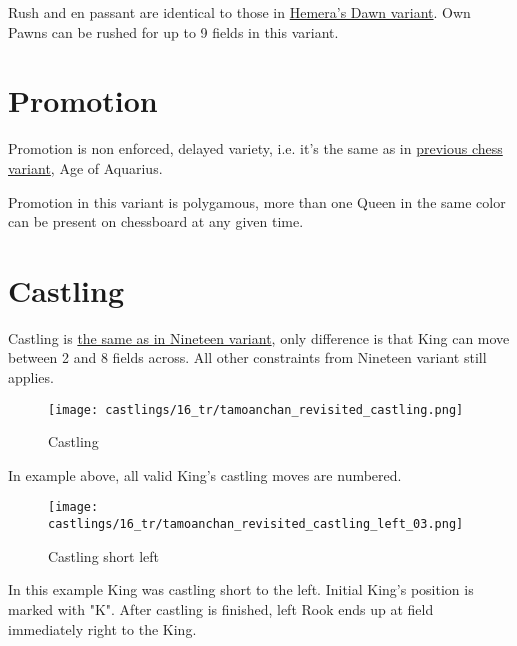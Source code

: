 Rush and en passant are identical to those in \hyperref[fig:14_hemera_s_dawn_en_passant]{Hemera's Dawn variant}.
Own Pawns can be rushed for up to 9 fields in this variant.

\clearpage %

\section*{Promotion}
\label{sec:Tamoanchan Revisited/Promotion}

Promotion is non enforced, delayed variety, i.e. it's the same as in
\hyperref[sec:Age of Aquarius/Promotion]{previous chess variant}, Age of Aquarius.

Promotion in this variant is polygamous, more than one Queen in the same color
can be present on chessboard at any given time.


\section*{Castling}
\label{sec:Tamoanchan Revisited/Castling}

Castling is
\hyperref[sec:Nineteen/Castling]{the same as in Nineteen variant},
only difference is that King can move
between 2 and 8 fields across. All other constraints from Nineteen variant still
applies.

\noindent
\begin{figure}[!h]
\texttt{[image: castlings/16\_tr/tamoanchan\_revisited\_castling.png]}
\caption{Castling}
\label{fig:tamoanchan_revisited_castling}
\end{figure}

In example above, all valid King's castling moves are numbered.

\noindent
\begin{figure}[!h]
\texttt{[image: castlings/16\_tr/tamoanchan\_revisited\_castling\_left\_03.png]}
\caption{Castling short left}
\label{fig:tamoanchan_revisited_castling_left_03}
\end{figure}

In this example King was castling short to the left. Initial King's position is
marked with "K". After castling is finished, left Rook ends up at field immediately
right to the King.

